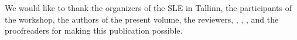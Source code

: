 \addchap{\lsAcknowledgementTitle} 

We would like to thank the organizers of the SLE in Tallinn, the participants of the workshop, the authors of the present volume, the reviewers, , , , and the proofreaders for making this publication possible.
